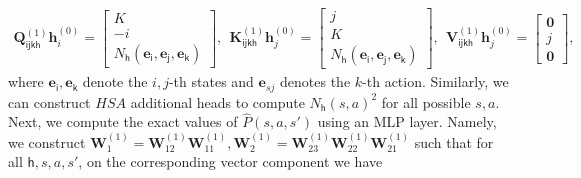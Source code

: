 \documentclass[10pt]{article}
\newcommand{\<}{\left\langle}
\renewcommand{\>}{\right\rangle}
\renewcommand{\bQ}{\mathbf{Q}}
\newcommand{\bzero}{{\mathbf 0}}
\newcommand{\state}{{s}}
\newcommand{\action}{{a}}
\newcommand{\Numepi}{{K}}
\newcommand{\horizon}{{H}}
\renewcommand{\horizon}{{H}}
\newcommand{\esttransit}{\widehat{P}}
\newcommand{\Numst}{{S}}
\newcommand{\Numact}{{A}}
\newcommand{\Numvi}{{N}}
\def\bK{{\mathbf K}}
\def\bQ{{\mathbf Q}}
\def\bV{{\mathbf V}}
\def\bW{{\mathbf W}}
\def\be{{\mathbf e}}
\def\bh{{\mathbf h}}
\def\si{{\mathsf{i}}}
\def\sj{{\mathsf{j}}}
\def\sk{{\mathsf{k}}}
\def\sh{{\mathsf{h}}}
\begin{document}
\begin{align*}
    \bQ_{\si\sj\sk\sh}^{(1)}\bh_i^{(0)}=\begin{bmatrix}
        \Numepi\\
        -i\\
        \Numvi_\sh(\be_\si,\be_\sj,\be_\sk)
    \end{bmatrix},~~\bK_{\si\sj\sk\sh}^{(1)}\bh_j^{(0)}=\begin{bmatrix}
        j\\ \Numepi\\
        \Numvi_\sh(\be_\si,\be_\sj,\be_\sk)
    \end{bmatrix},~~
    \bV_{\si\sj\sk\sh}^{(1)}\bh_j^{(0)}=\begin{bmatrix}
        \bzero\\j\\\bzero
    \end{bmatrix},
\end{align*} where $\be_\si,\be_\sk$ denote the $i,j$-th states and $\be_{sj}$ denotes the $k$-th action.
Similarly, we can construct $\horizon\Numst\Numact$ additional heads
to compute $\Numvi_\sh(\state,\action)^2$ for all possible $\state,\action.$
Next, we compute the exact values of $\esttransit(\state,\action,\state')$ using an MLP layer. Namely,
we  construct $\bW^{(1)}_1=\bW^{(1)}_{12}\bW^{(1)}_{11},\bW^{(1)}_2=\bW^{(1)}_{23}\bW^{(1)}_{22}\bW^{(1)}_{21}$  such that for all $\sh,\state,\action,\state'$, on the corresponding vector component we have
\end{document}
